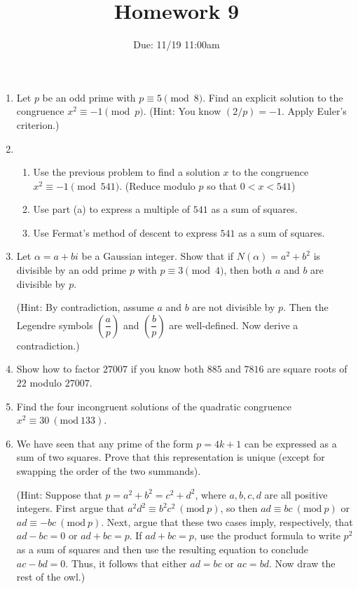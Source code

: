 \documentclass[11pt]{article}
\title{Homework 9}
\author{Due: 11/19 11:00am}
\date{}
\theoremstyle{definition}
\newcommand{\leg}[2]{\genfrac(){}{0}{#1}{#2}}
\newcommand{\legp}[1]{\leg{#1}{p}}
\newcommand{\Mod}[1]{\ (\mathrm{mod}\ #1)}
\begin{document}
\maketitle

\begin{enumerate}
    \item Let $p$ be an odd prime with $p\equiv 5\pmod{8}$. Find an explicit solution to the congruence $x^2 \equiv -1 \pmod p$. (Hint: You know $(2/p) = -1$. Apply Euler's criterion.)

    \item \begin{enumerate}
        \item Use the previous problem to find a solution $x$ to the congruence $x^2 \equiv -1 \pmod{541}$. (Reduce modulo $p$ so that $0<x<541$)
        \item Use part (a) to express a multiple of $541$ as a sum of squares.
        \item Use Fermat's method of descent to express $541$ as a sum of squares.
    \end{enumerate}

    \item Let $\alpha = a + bi$ be a Gaussian integer. Show that if $N(\alpha) = a^2 + b^2$ is divisible by an odd prime $p$ with $p\equiv 3 \pmod 4$, then both $a$ and $b$ are divisible by $p$.
    
    (Hint: By contradiction, assume $a$ and $b$ are not divisible by $p$. Then the Legendre symbols $\legp{a}$ and $\legp{b}$ are well-defined. Now derive a contradiction.)

    \item Show how to factor $27007$ if you know both $885$ and $7816$ are square roots of $22$ modulo $27007$.

    \item Find the four incongruent solutions of the quadratic congruence $x^2 \equiv 30 \Mod{133}$.

    \item We have seen that any prime of the form $p = 4k+1$ can be expressed as a sum of two squares. Prove that this representation is unique (except for swapping the order of the two summands).

    (Hint: Suppose that $p = a^2 + b^2 = c^2 + d^2$, where $a,b,c,d$ are all positive integers. First argue that $a^2d^2 \equiv b^2 c^2 \Mod p$, so then $ad \equiv bc \Mod p$ or $ad \equiv -bc \Mod p$. Next, argue that these two cases imply, respectively, that $ad - bc = 0$ or $ad + bc = p$. If $ad + bc = p$, use the product formula to write $p^2$ as a sum of squares and then use the resulting equation to conclude $ac - bd = 0$. Thus, it follows that either $ad = bc$ or $ac = bd$. Now draw the rest of the owl.)

    
\end{enumerate}
\end{document}

